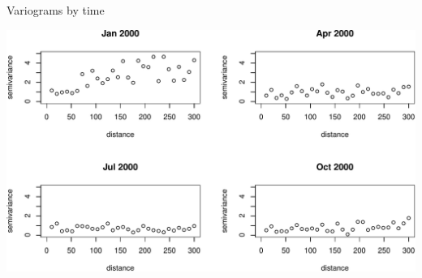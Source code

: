 \documentclass[11pt,ignorenonframetext,]{beamer}
\begin{document}
\begin{frame}{Variograms by time}

\includegraphics{Lec23_files/figure-beamer/unnamed-chunk-3-1.pdf}

\end{frame}
\end{document}

